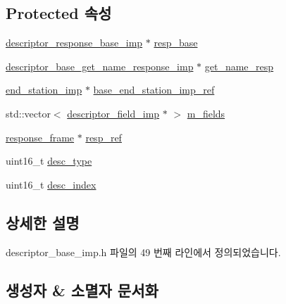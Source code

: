 \subsection*{Protected 속성}
\begin{DoxyCompactItemize}
\item 
\hyperlink{classavdecc__lib_1_1descriptor__response__base__imp}{descriptor\+\_\+response\+\_\+base\+\_\+imp} $\ast$ \hyperlink{classavdecc__lib_1_1descriptor__base__imp_a8b104da8319cda946944548ebb9552f4}{resp\+\_\+base}
\item 
\hyperlink{classavdecc__lib_1_1descriptor__base__get__name__response__imp}{descriptor\+\_\+base\+\_\+get\+\_\+name\+\_\+response\+\_\+imp} $\ast$ \hyperlink{classavdecc__lib_1_1descriptor__base__imp_a7d3a410eb242dc2b7abe9862a1593458}{get\+\_\+name\+\_\+resp}
\item 
\hyperlink{classavdecc__lib_1_1end__station__imp}{end\+\_\+station\+\_\+imp} $\ast$ \hyperlink{classavdecc__lib_1_1descriptor__base__imp_a550c969411f5f3b69f55cc139763d224}{base\+\_\+end\+\_\+station\+\_\+imp\+\_\+ref}
\item 
std\+::vector$<$ \hyperlink{classavdecc__lib_1_1descriptor__field__imp}{descriptor\+\_\+field\+\_\+imp} $\ast$ $>$ \hyperlink{classavdecc__lib_1_1descriptor__base__imp_adce67136eb9c66da9c189b730077b9cd}{m\+\_\+fields}
\item 
\hyperlink{classavdecc__lib_1_1response__frame}{response\+\_\+frame} $\ast$ \hyperlink{classavdecc__lib_1_1descriptor__base__imp_a2642e3a7c10d38553e7ff4a55e875346}{resp\+\_\+ref}
\item 
uint16\+\_\+t \hyperlink{classavdecc__lib_1_1descriptor__base__imp_a9dada313309522d04f1e52fe887442b4}{desc\+\_\+type}
\item 
uint16\+\_\+t \hyperlink{classavdecc__lib_1_1descriptor__base__imp_a2bbd0d8f32f687ca36aaa543c06f764c}{desc\+\_\+index}
\end{DoxyCompactItemize}


\subsection{상세한 설명}


descriptor\+\_\+base\+\_\+imp.\+h 파일의 49 번째 라인에서 정의되었습니다.



\subsection{생성자 \& 소멸자 문서화}
